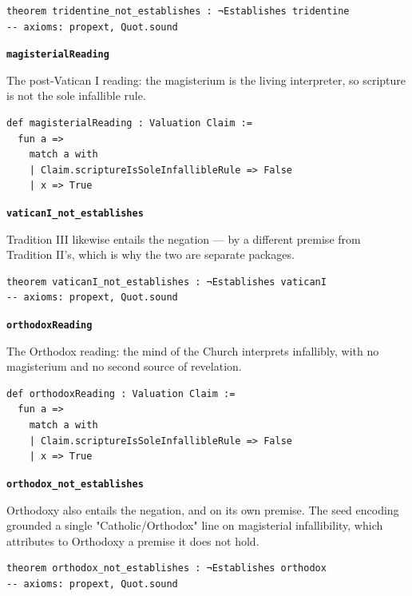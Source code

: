 \documentclass[11pt]{article}
\begin{document}
{\small\begin{verbatim}
theorem tridentine_not_establishes : ¬Establishes tridentine
-- axioms: propext, Quot.sound
\end{verbatim}}
\par\medskip\noindent\textbf{\texttt{magisterial\allowbreak{}Reading}}\par\nobreak\noindent
The post-Vatican I reading: the magisterium is the living interpreter, so scripture is not the sole infallible rule.

{\small\begin{verbatim}
def magisterialReading : Valuation Claim :=
  fun a =>
    match a with
    | Claim.scriptureIsSoleInfallibleRule => False
    | x => True
\end{verbatim}}
\par\medskip\noindent\textbf{\texttt{vatican\allowbreak{}I\_\allowbreak{}not\_\allowbreak{}establishes}}\par\nobreak\noindent
Tradition III likewise entails the negation — by a different premise from Tradition II's, which is why the two are separate packages.

{\small\begin{verbatim}
theorem vaticanI_not_establishes : ¬Establishes vaticanI
-- axioms: propext, Quot.sound
\end{verbatim}}
\par\medskip\noindent\textbf{\texttt{orthodox\allowbreak{}Reading}}\par\nobreak\noindent
The Orthodox reading: the mind of the Church interprets infallibly, with no magisterium and no second source of revelation.

{\small\begin{verbatim}
def orthodoxReading : Valuation Claim :=
  fun a =>
    match a with
    | Claim.scriptureIsSoleInfallibleRule => False
    | x => True
\end{verbatim}}
\par\medskip\noindent\textbf{\texttt{orthodox\_\allowbreak{}not\_\allowbreak{}establishes}}\par\nobreak\noindent
Orthodoxy also entails the negation, and on its own premise. The seed encoding grounded a single "Catholic/Orthodox" line on magisterial infallibility, which attributes to Orthodoxy a premise it does not hold.

{\small\begin{verbatim}
theorem orthodox_not_establishes : ¬Establishes orthodox
-- axioms: propext, Quot.sound
\end{verbatim}}
\end{document}
